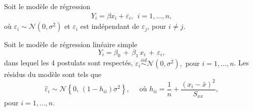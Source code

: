 \begin{questions}
\begin{solution}
\begin{parts}
\part
\[E(\mathbf W)=\mathbf C\boldsymbol\mu_W=\begin{pmatrix}1\\0\end{pmatrix},\]
\[\operatorname{Var}(\mathbf W)=\mathbf C\boldsymbol\Sigma_W\mathbf C^\top
=\begin{pmatrix}1&0\\0&1\end{pmatrix}\begin{pmatrix}2&1\\1&4\end{pmatrix}\begin{pmatrix}1&0\\0&1\end{pmatrix}
=\begin{pmatrix}2&1\\1&4\end{pmatrix}.\]
\end{parts}
\end{solution}

\pageblanche

\question
Soit le modèle de régression 
\begin{align*}
    Y_i=\beta x_i + \varepsilon_i, \ \ i=1,\hdots, n,
\end{align*}
où $\varepsilon_i\sim \mathcal{N}(0, \sigma^2)$ et $\varepsilon_i$ est indépendant de $\varepsilon_j$, pour $i\neq j$.


\pageblanche

\question[11]
Soit le modèle de régression linéaire simple 
\begin{equation*}
    Y_i = \beta_0\,+\,\beta_1\, x_i \,+\, \varepsilon_i,
\end{equation*}
dans lequel les 4 postulats sont respectés, $\varepsilon_i \overset{iid}{\sim} \mathcal{N}(0, \sigma^2), \text{ pour } i=1,\ldots,n$.
Les résidus du modèle sont tels que 
\begin{equation*}
\widehat{\varepsilon}_i \sim \mathcal{N} \left\{0, \, (1-h_{ii})\sigma^2\right\}, \quad \mbox{ où } h_{ii}=\frac{1}{n}+\frac{(x_i - \bar x)^2}{S_{xx}},
\end{equation*}
pour $i=1,\ldots,n$.


\end{questions}
